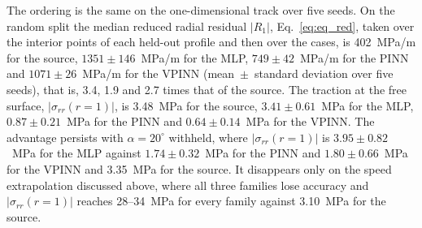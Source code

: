 \documentclass[subscriptcorrection,upint,varvw,barcolor=Goldenrod3,mathalfa=cal=euler,balance,hyphenate,french,pdf-a]{asmejour} %
\begin{document}
The ordering is the same on the one-dimensional track over five seeds.
On the random split the median reduced radial residual $|R_1|$, Eq.~\eqref{eq:eq_red}, taken over the interior points of each held-out profile and then over the cases, is 402~MPa/m for the source, $1351\pm146$~MPa/m for the MLP, $749\pm42$~MPa/m for the PINN and $1071\pm26$~MPa/m for the VPINN (mean~$\pm$~standard deviation over five seeds), that is, 3.4, 1.9 and 2.7 times that of the source. The traction at the free surface, $|\sigma_{rr}(r{=}1)|$, is 3.48~MPa for the source, $3.41\pm0.61$~MPa for the MLP, $0.87\pm0.21$~MPa for the PINN and $0.64\pm0.14$~MPa for the VPINN. The advantage persists with $\alpha=20^\circ$ withheld, where $|\sigma_{rr}(r{=}1)|$ is $3.95\pm0.82$~MPa for the MLP against $1.74\pm0.32$~MPa for the PINN and $1.80\pm0.66$~MPa for the VPINN and 3.35~MPa for the source. It disappears only on the speed extrapolation discussed above, where all three families lose accuracy and $|\sigma_{rr}(r{=}1)|$ reaches 28--34~MPa for every family against 3.10~MPa for the source. %

\end{document}
